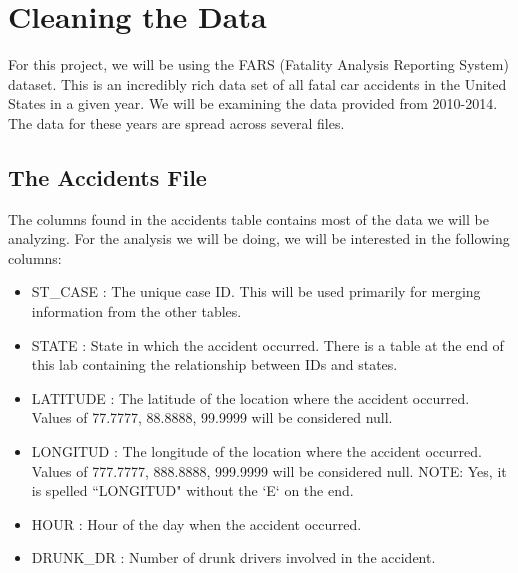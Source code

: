 \section*{Cleaning the Data}
For this project, we will be using the FARS (Fatality Analysis Reporting System)
dataset. This is an incredibly rich data set of all fatal car accidents in the
United States in a given year. We will be examining the data provided from
2010-2014. The data for these years are spread across several files.

\subsection*{The Accidents File}
The columns found in the accidents table contains most of the data we will be
analyzing. For the analysis we will be doing, we will be interested in the
following columns:
\begin{itemize}
    \item ST\_CASE : The unique case ID. This will be used primarily for merging
        information from the other tables.
    \item STATE : State in which the accident occurred. There is a table at the
        end of this lab containing the relationship between IDs and states.
    \item LATITUDE : The latitude of the location where the accident occurred.
        Values of 77.7777, 88.8888, 99.9999 will be considered null.
    \item LONGITUD : The longitude of the location where the accident occurred.
        Values of 777.7777, 888.8888, 999.9999 will be considered null.
        NOTE: Yes, it is spelled ``LONGITUD" without the `E` on the end.
    \item HOUR : Hour of the day when the accident occurred.
    \item DRUNK\_DR : Number of drunk drivers involved in the accident.
\end{itemize}

